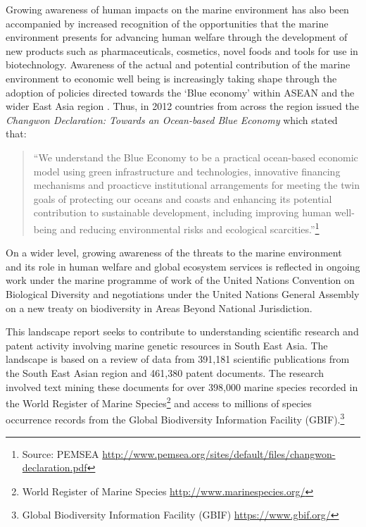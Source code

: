 \documentclass[openany]{book}
\let\rmarkdownfootnote\footnote%
\def\footnote{\protect\rmarkdownfootnote}
\theoremstyle{definition}
\theoremstyle{definition}
\theoremstyle{definition}
\theoremstyle{remark}
\begin{document}
Growing awareness of human impacts on the marine environment has also
been accompanied by increased recognition of the opportunities that the
marine environment presents for advancing human welfare through the
development of new products such as pharmaceuticals, cosmetics, novel
foods and tools for use in biotechnology. Awareness of the actual and
potential contribution of the marine environment to economic well being
is increasingly taking shape through the adoption of policies directed
towards the `Blue economy' within ASEAN and the wider East Asia region
\citep{Gamage_2016}. Thus, in 2012 countries from across the region
issued the \emph{Changwon Declaration: Towards an Ocean-based Blue
Economy} which stated that:

\begin{quote}
``We understand the Blue Economy to be a practical ocean-based economic
model using green infrastructure and technologies, innovative financing
mechanisms and proacticve institutional arrangements for meeting the
twin goals of protecting our oceans and coasts and enhancing its
potential contribution to sustainable development, including improving
human well-being and reducing environmental risks and ecological
scarcities.''\footnote{Source: PEMSEA
  \url{http://www.pemsea.org/sites/default/files/changwon-declaration.pdf}}
\end{quote}

On a wider level, growing awareness of the threats to the marine
environment and its role in human welfare and global ecosystem services
is reflected in ongoing work under the marine programme of work of the
United Nations Convention on Biological Diversity and negotiations under
the United Nations General Assembly on a new treaty on biodiversity in
Areas Beyond National Jurisdiction.

This landscape report seeks to contribute to understanding scientific
research and patent activity involving marine genetic resources in South
East Asia. The landscape is based on a review of data from 391,181
scientific publications from the South East Asian region and 461,380
patent documents. The research involved text mining these documents for
over 398,000 marine species recorded in the World Register of Marine
Species\footnote{World Register of Marine Species
  \url{http://www.marinespecies.org/}} and access to millions of species
occurrence records from the Global Biodiversity Information Facility
(GBIF).\footnote{Global Biodiversity Information Facility (GBIF)
  \url{https://www.gbif.org/}}
\end{document}
